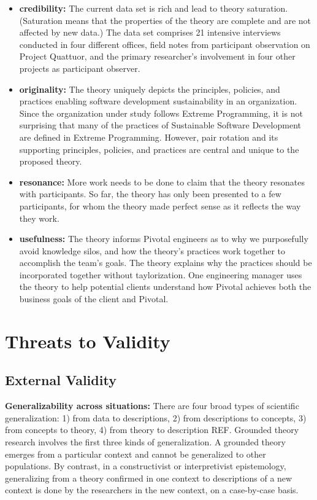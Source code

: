 \begin{table}[]
\begin{itemize}
\item 
\textbf{credibility:}  The current data set is rich and lead to theory saturation. (Saturation means that the properties of the theory are complete and are not affected by new data.) The data set comprises 21 intensive interviews conducted in four different offices,  field notes from participant observation on Project Quattuor, and the primary researcher's involvement in four other projects as participant observer.

\item
\textbf{originality:} The theory uniquely depicts the principles, policies, and practices enabling software development sustainability in an organization. Since the organization under study follows Extreme Programming, it is not surprising that many of the practices of Sustainable Software Development are defined in Extreme Programming. However, pair rotation and its supporting principles, policies, and practices are central and unique to the proposed theory.

\item
\textbf{resonance:} More work needs to be done to claim that the theory resonates with participants. So far, the theory has only been presented to a few participants, for whom the theory made perfect sense as it reflects the way they work. 

\item
\textbf{usefulness:}  The theory informs Pivotal engineers as to why we purposefully avoid knowledge silos, and how the theory's practices work together to accomplish the team's goals.  The theory explains why the practices should be incorporated together without taylorization. One engineering manager uses the theory to help potential clients understand how Pivotal  achieves both the business goals of the client and Pivotal.

\end{itemize}

\section{Threats to Validity}

\subsection{External Validity}

\textbf{Generalizability across situations:} There are four broad types of scientific generalization: 1) from data to descriptions, 2) from descriptions to concepts, 3) from concepts to theory, 4) from theory to description REF. Grounded theory research involves the first three kinds of generalization. A grounded theory emerges from a particular context and cannot be generalized to other populations. By contrast, in a constructivist or interpretivist epistemology, generalizing from a theory confirmed in one context to descriptions of a new context is done by the researchers in the new context, on a case-by-case basis. 


\end{table}
